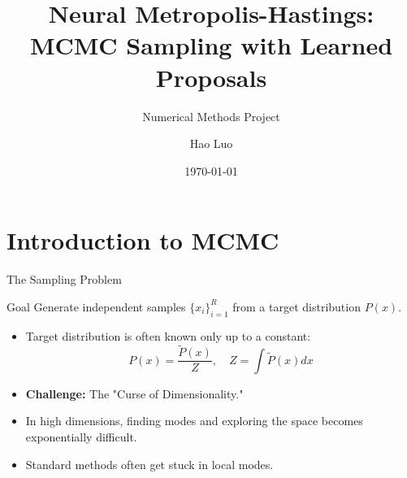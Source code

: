 \documentclass[aspectratio=169]{beamer}
\title[Neural Metropolis-Hastings]{Neural Metropolis-Hastings: \\ MCMC Sampling with Learned Proposals}
\subtitle{Numerical Methods Project}
\author{Hao Luo}
\date{\today}
\begin{document}
\begin{frame}
    \titlepage
\end{frame}



\section{Introduction to MCMC}

\begin{frame}{The Sampling Problem}
    \begin{block}{Goal}
        Generate independent samples $\{x_i\}_{i=1}^R$ from a target distribution $P(x)$.
    \end{block}
    
    \vspace{0.5cm}
    
    \begin{itemize}
        \item Target distribution is often known only up to a constant:
        $$ P(x) = \frac{\tilde{P}(x)}{Z}, \quad Z = \int \tilde{P}(x) dx $$
        \item \textbf{Challenge:} The "Curse of Dimensionality."
        \item In high dimensions, finding modes and exploring the space becomes exponentially difficult.
        \item Standard methods often get stuck in local modes.
    \end{itemize}
\end{frame}
\end{document}
